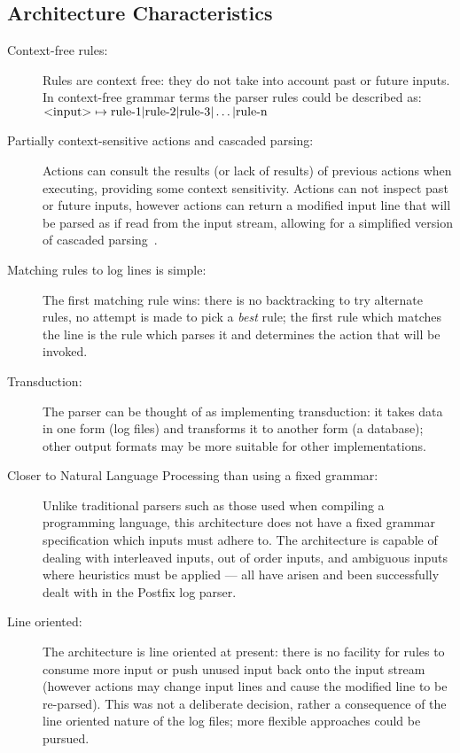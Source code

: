 \documentclass[draft]{svmult}
\begin{document}
\subsection{Architecture Characteristics}

\label{Architecture characteristics}

\begin{description}

    \item [Context-free rules:]  Rules are context free: they do not take
        into account past or future inputs.  In context-free
        grammar terms the parser rules could be described as:
        $\text{\textless{}input\textgreater{}} \mapsto \text{rule-1} |
        \text{rule-2} | \text{rule-3} | \dots | \text{rule-n}$

    \item [Partially context-sensitive actions and cascaded parsing:]
        Actions can consult the results (or lack of results) of previous
        actions when executing, providing some context sensitivity.
        Actions can not inspect past or future inputs, however actions
        can return a modified input line that will be parsed as if read
        from the input stream, allowing for a simplified version of
        cascaded parsing~\cite{cascaded-parsing}.

    \item [Matching rules to log lines is simple:]  The first matching rule
        wins: there is no backtracking to try alternate rules, no attempt
        is made to pick a \textit{best\/} rule; the first rule which
        matches the line is the rule which parses it and determines the
        action that will be invoked.

    \item [Transduction:]  The parser can be thought of as implementing
        transduction: it takes data in one form (log files) and transforms
        it to another form (a database); other output formats may be more
        suitable for other implementations.

    \item [Closer to Natural Language Processing than using a fixed
        grammar:] Unlike traditional parsers such as those used when
        compiling a programming language, this architecture does not have a
        fixed grammar specification which inputs must adhere to.  The
        architecture is capable of dealing with interleaved inputs, out of
        order inputs, and ambiguous inputs where heuristics must be applied
        --- all have arisen and been successfully dealt with in the Postfix
        log parser.

    \item [Line oriented:]  The architecture is line oriented at present:
        there is no facility for rules to consume more input or push unused
        input back onto the input stream (however actions may change input
        lines and cause the modified line to be re-parsed).  This was not a
        deliberate decision, rather a consequence of the line oriented
        nature of the log files; more flexible approaches could be pursued.

\end{description}
\end{document}
